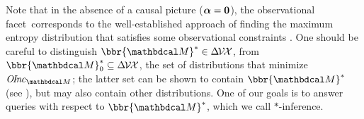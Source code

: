 \documentclass[twoside]{article}
\newcommand\obslimit{observational facet} %
\begin{document}
Note that in the absence of a causal picture ($\boldsymbol\alpha = \mathbf{0}$), 
the \obslimit\ corresponds to the well-established approach of finding
the maximum entropy distribution that satisfies some observational constraints \parencite{jaynes1957information}.
%
One should be careful to distinguish $\bbr{\dg M}^* \in \Delta\mskip-2mu \V \mskip-2mu\X$,
from $\bbr{\dg M}^*_0 \subseteq \Delta\mskip-2mu \V \mskip-2mu\X$, the set of distributions that minimize
$\OInc_{\dg M}$; the latter set can be shown to contain $\bbr{\dg
  M}^*$ (see \cite{pdg-aaai}),
but may also contain other distributions.
One of our goals is to answer queries with respect to $\bbr{\dg M}^*$, 
which we call $*$-inference. 
%
\end{document}
